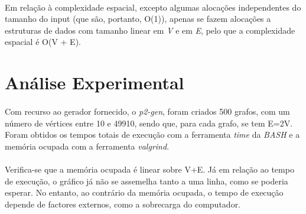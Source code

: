 \documentclass[12pt, a4paper]{article}
\begin{document}
\paragraph{}
Em relação à complexidade espacial, excepto algumas alocações independentes do
tamanho do input (que são, portanto, O(1)), apenas se fazem alocações a
estruturas de dados com tamanho linear em \textit{V} e em \textit{E}, pelo que a
complexidade espacial é O(V + E).

\section{Análise Experimental}
\paragraph{}
Com recurso ao gerador fornecido, o \textit{p2-gen}, foram criados 500 grafos,
com um número de vértices entre 10 e 49910, sendo que, para cada grafo, se tem
E=2V. Foram obtidos os tempos totais de execução com a ferramenta \textit{time}
da \textit{BASH} e a memória ocupada com a ferramenta \textit{valgrind}.
\paragraph{}
Verifica-se que a memória ocupada é linear sobre V+E.
Já em relação ao tempo de execução, o gráfico já não se assemelha tanto a uma
linha, como se poderia esperar. No entanto, ao contrário da memória ocupada, o
tempo de execução depende de factores externos, como a sobrecarga do computador.

\paragraph{}

\centering
{}
\end{document}
